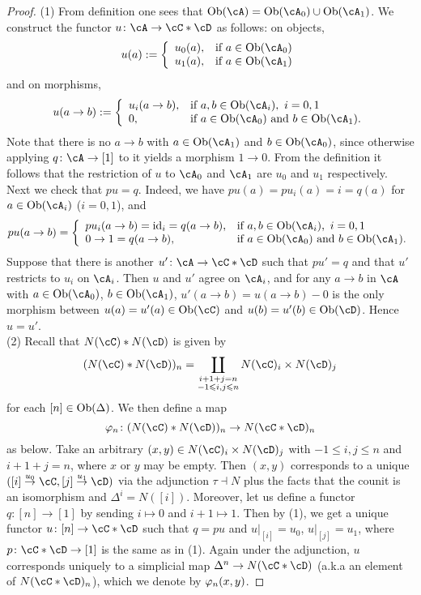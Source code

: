 \documentclass[a4paper,11pt,openany]{scrartcl}
\begin{document}
\begin{proof}
(1) From definition one sees that $\Ob(\cA)=\Ob(\cA_0)\cup\Ob(\cA_1)$. We construct the functor $u\colon\cA\to\cC*\cD$ as follows: on objects, 
\[
u(a):=\left\{
\begin{array}{ll}
u_0(a),&\text{if }a\in\Ob(\cA_0)\\
u_1(a),&\text{if }a\in\Ob(\cA_1)
\end{array}
\right.
\]
and on morphisms,
\[
u(a\to b):=\left\{
\begin{array}{ll}
u_i(a\to b),&\text{if } a,b\in\Ob(\cA_i),\ i=0,1\\
0,&\text{if $a\in\Ob(\cA_0)$ and $b\in\Ob(\cA_1)$}.
\end{array}
\right.
\]
Note that there is no $a\to b$ with $a\in\Ob(\cA_1)$ and $b\in\Ob(\cA_0)$, since otherwise applying $q\colon\cA\to[1]$ to it yields a morphism $1\to0$. From the definition it follows that the restriction of $u$ to $\cA_0$ and $\cA_1$ are $u_0$ and $u_1$ respectively. Next we check that $pu=q$. Indeed, we have $pu(a)=pu_i(a)=i=q(a)$ for $a\in\Ob(\cA_i)$ ($i=0,1$), and
\[
pu(a\to b)=\left\{
\begin{array}{ll}
pu_i(a\to b)=\id_i=q(a\to b),&\text{if }a,b\in\Ob(\cA_i),\ i=0,1\\
0\to 1=q(a\to b),&\text{if }a\in\Ob(\cA_0)\text{ and }b\in\Ob(\cA_1).
\end{array}
\right.
\]
Suppose that there is another $u'\colon\cA\to\cC*\cD$ such that $pu'=q$ and that $u'$ restricts to $u_i$ on $\cA_i$. Then $u$ and $u'$ agree on $\cA_i$, and for any $a\to b$ in $\cA$ with $a\in\Ob(\cA_0)$, $b\in\Ob(\cA_1)$, $u'(a\to b)=u(a\to b)-0$ is the only morphism between $u(a)=u'(a)\in\Ob(\cC)$ and $u(b)=u'(b)\in\Ob(\cD)$. Hence $u=u'$.\\

(2) Recall that $N(\cC)*N(\cD)$ is given by
\[
(N(\cC)*N(\cD))_n=\coprod_{\substack{i+1+j=n\\-1\leqslant i,j\leqslant n}}N(\cC)_i\times N(\cD)_j
\]
for each $[n]\in\operatorname{Ob}(\Delta)$. We then define a map
\[
\f_n\colon (N(\cC)*N(\cD))_n\to N(\cC*\cD)_n
\]
as below. Take an arbitrary $(x,y)\in N(\cC)_i\times N(\cD)_j$ with $-1\leqslant i,j\leqslant n$ and $i+1+j=n$, where $x$ or $y$ may be empty. Then $(x,y)$ corresponds to a unique $([i]\overset{u_0}{\to}\cC,[j]\overset{u_1}{\to}\cD)$ via the adjunction $\tau\dashv N$ plus the facts that the counit is an isomorphism and $\Delta^i=N([i])$. Moreover, let us define a functor $q\colon[n]\to[1]$ by sending $i\mapsto0$ and $i+1\mapsto 1$. Then by (1), we get a unique functor $u\colon[n]\to\cC*\cD$ such that $q=pu$ and $u|_{[i]}=u_0$, $u|_{[j]}=u_1$, where $p\colon\cC*\cD\to[1]$ is the same as in (1). Again under the adjunction, $u$ corresponds uniquely to a simplicial map $\Delta^n\to N(\cC*\cD)$ (a.k.a an element of $N(\cC*\cD)_n$), which we denote by $\varphi_n(x,y)$.


\end{proof}
\end{document}

